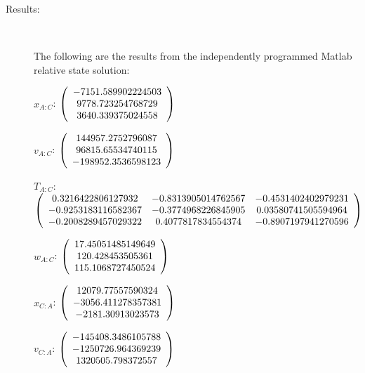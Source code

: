 \begin{description}
\item[Results:] \ \newline

The following are the results from the independently programmed Matlab relative state
solution:

$x_{A:C}$: $\left( \begin{array} {ccc}  -7151.589902224503 \\     9778.723254768729 \\     3640.339375024558
\end{array} \right)\\ \\$

$v_{A:C}$:  $\left( \begin{array} {ccc}  144957.2752796087 \\     96815.65534740115 \\    -198952.3536598123
\end{array} \right)\\ \\$

$T_{A:C}$: $\left( \begin{array} {ccc}
 0.3216422806127932 &   -0.8313905014762567 &   -0.4531402402979231 \\
  -0.9253183116582367 &   -0.3774968226845905 &   0.03580741505594964 \\
   -0.2008289457029322 &    0.4077817834554374 &   -0.8907197941270596 \\
\end{array} \right)\\ \\$

$w_{A:C}$:  $\left( \begin{array} {ccc}  17.45051485149649 \\      120.428453505361 \\     115.1068727450524
\end{array} \right)\\ \\$

$x_{C:A}$: $\left( \begin{array} {ccc} 12079.77557590324 \\    -3056.411278357381 \\     -2181.30913023573
\end{array} \right)\\ \\$

$v_{C:A}$:  $\left( \begin{array} {ccc}  -145408.3486105788 \\    -1250726.964369239 \\     1320505.798372557
\end{array} \right)\\ \\$


\end{description}
